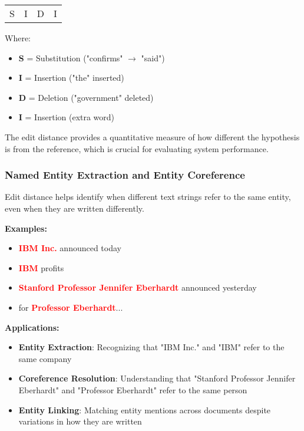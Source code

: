 \documentclass[11pt,a4paper]{article}
\theoremstyle{definition}
\theoremstyle{plain}
\theoremstyle{remark}
\begin{document}
\begin{center}
\begin{tabular}{cccc}
S & I & D & I \\
\end{tabular}
\end{center}

Where:
\begin{itemize}
    \item \textbf{S} = Substitution ("confirms" $\rightarrow$ "said")
    \item \textbf{I} = Insertion ("the" inserted)
    \item \textbf{D} = Deletion ("government" deleted)
    \item \textbf{I} = Insertion (extra word)
\end{itemize}

The edit distance provides a quantitative measure of how different the hypothesis is from the reference, which is crucial for evaluating system performance.

\subsubsection{Named Entity Extraction and Entity Coreference}

Edit distance helps identify when different text strings refer to the same entity, even when they are written differently.

\textbf{Examples:}
\begin{itemize}
    \item \textcolor{red}{\textbf{IBM Inc.}} announced today
    \item \textcolor{red}{\textbf{IBM}} profits
    \item \textcolor{red}{\textbf{Stanford Professor Jennifer Eberhardt}} announced yesterday
    \item for \textcolor{red}{\textbf{Professor Eberhardt}}...
\end{itemize}

\textbf{Applications:}
\begin{itemize}
    \item \textbf{Entity Extraction}: Recognizing that "IBM Inc." and "IBM" refer to the same company
    \item \textbf{Coreference Resolution}: Understanding that "Stanford Professor Jennifer Eberhardt" and "Professor Eberhardt" refer to the same person
    \item \textbf{Entity Linking}: Matching entity mentions across documents despite variations in how they are written
\end{itemize}
\end{document}
